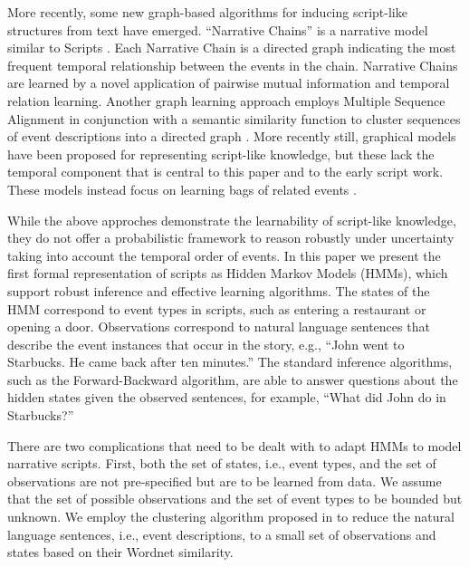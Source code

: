 \documentclass[letterpaper]{article}
\begin{document}
More recently, some new graph-based algorithms for inducing script-like structures from text have emerged.  ``Narrative Chains'' is a narrative model similar to Scripts \cite{chambers2008unsupervised}. Each Narrative Chain is a directed graph indicating the most frequent temporal relationship between the events in the chain. Narrative Chains are learned by a novel application of pairwise mutual information and temporal relation learning. %
Another graph learning approach employs Multiple Sequence Alignment in conjunction with a semantic similarity function to cluster sequences of event descriptions into a directed graph \cite{regneri2010learning}. More recently still, graphical models have been proposed for representing script-like knowledge, but these lack the temporal component that is central to this paper and to the early script work. These models instead focus on learning bags of related events \cite{chambers2013event,kit2013probabilistic}.

While the above approches demonstrate the learnability of script-like knowledge, they do not offer a probabilistic framework to reason robustly under uncertainty taking into account the temporal order of events.
In this paper we present the first formal representation of scripts as Hidden Markov Models (HMMs), which support robust inference and effective learning algorithms.
The states of the HMM correspond to event types in scripts, such as entering a restaurant or opening a door. Observations correspond to natural language sentences that describe the event instances that occur in the story, e.g., ``John went to Starbucks. He came back after ten minutes.''  The standard inference algorithms, such as the Forward-Backward algorithm, are able to answer questions about the hidden states given the observed sentences, for example, ``What did John do in Starbucks?''

There are two complications that need to be dealt with to adapt HMMs to model narrative scripts. First, both the set of states, i.e., event types, and the set of observations are not pre-specified but are to be learned from data. We assume that the set of possible observations and the set of event types to be bounded but unknown. We employ the clustering algorithm proposed in \cite{regneri2010learning} to reduce the natural language sentences, i.e., event descriptions,  to a small set of observations and states based on their Wordnet similarity.
\end{document}
